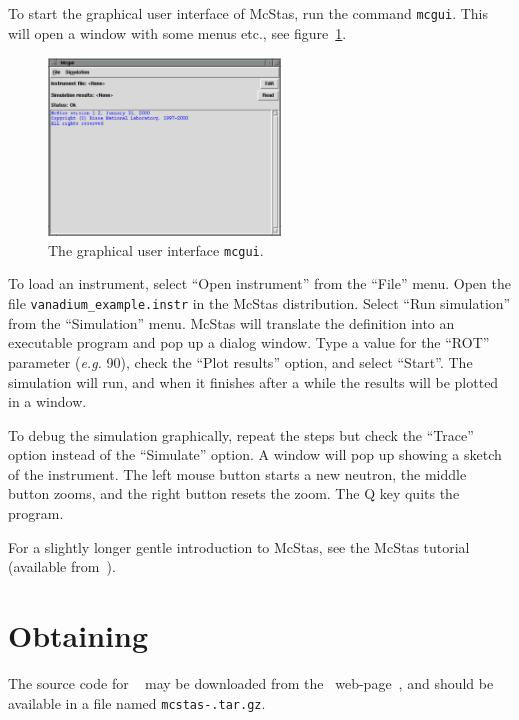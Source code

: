 To start the graphical user interface of McStas, run the command
\verb+mcgui+. This will open a window with some menus etc.,
see figure~\ref{fig:mcgui}.
\begin{figure}[th]
  \begin{center}
    \includegraphics[width=0.55\textwidth]{figures/mcgui.eps}
  \end{center}
\caption{The graphical user interface \texttt{mcgui}.}
\label{fig:mcgui}
\end{figure}

To load an instrument, select ``Open instrument'' from the ``File''
menu. Open the file \verb+vanadium_example.instr+ in the McStas
distribution. Select ``Run simulation'' from the ``Simulation'' menu.
McStas will translate the definition into an executable program and pop
up a dialog window. Type a value for the ``ROT'' parameter ({\em e.g.}
90), check the ``Plot results'' option, and select ``Start''. The
simulation will run, and when it finishes after a while the results will
be plotted in a window.

To debug the simulation graphically, repeat the
steps but check the ``Trace'' option instead of the ``Simulate'' option.
A window will pop up showing a sketch of the instrument.
The left mouse button starts a new neutron, the middle button zooms, and
the right button resets the zoom. The Q key quits the program.

For a slightly longer gentle introduction to McStas, see the McStas
tutorial (available from~\cite{mcstas_webpage}).

\section{Obtaining \MCS}
\label{s:obtain}

The source code for \MCS\ 
may be downloaded from the \MCS\ web-page~\cite{mcstas_webpage}, and 
should be available in a file named
\verb+mcstas-+\version\verb+.tar.gz+.

